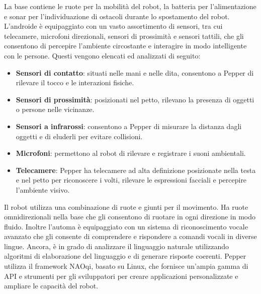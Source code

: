 \begin{sloppypar}
{\newline
La base contiene le ruote per la mobilità del robot, la batteria per l'alimentazione e sonar per l'individuazione di ostacoli durante lo spostamento del robot.
\newline
L'androide è equipaggiato con un vasto assortimento di sensori,
tra cui telecamere, microfoni direzionali, sensori di prossimità e sensori tattili, che
gli consentono di percepire l’ambiente circostante e interagire in modo intelligente
con le persone. 
\newline
Questi vengono elencati ed analizzati di seguito:
\vspace{0.3cm}
\begin{itemize}
   \item \textbf{Sensori di contatto}: situati nelle mani e nelle dita, consentono a Pepper di rilevare il tocco e le interazioni fisiche.
   \vspace{0.3cm}
   \item \textbf{Sensori di prossimità}: posizionati nel petto, rilevano la presenza di oggetti o persone nelle vicinanze.
   \vspace{0.3cm}
   \item \textbf{Sensori a infrarossi}: consentono a Pepper di misurare la distanza dagli oggetti e di eluderli per evitare collisioni.
   \vspace{0.25cm}
   \item \textbf{Microfoni}: permettono al robot di rilevare e registrare i suoni ambientali.
   \vspace{0.3cm}
   \item \textbf{Telecamere}: Pepper ha telecamere ad alta definizione posizionate nella testa e nel petto per riconoscere i volti, rilevare le espressioni facciali e percepire l'ambiente visivo.
   \vspace{0.3cm}
\end{itemize}
Il robot utilizza una combinazione di ruote e giunti per il movimento. Ha ruote omnidirezionali nella base che gli consentono di ruotare in ogni direzione in modo fluido. Inoltre l'automa è equipaggiato con un sistema di riconoscimento vocale avanzato che gli consente di comprendere e rispondere a comandi vocali in diverse lingue. Ancora, è in grado di analizzare il linguaggio naturale utilizzando algoritmi di elaborazione del linguaggio e di generare risposte coerenti.
\newline
Pepper utilizza il framework NAOqi, basato su Linux, che fornisce un'ampia gamma di API e strumenti per gli sviluppatori per creare applicazioni personalizzate e ampliare le capacità del robot.\newline
}
\end{sloppypar}
